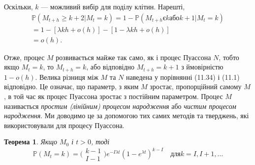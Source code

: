\documentclass[12pt,fleqn]{article}
\newtheorem{theorem}{Теорема}[section]
\numberwithin{figure}{section}
\numberwithin{equation}{section}
\begin{document}
Оскільки, $k$ --- можливий вибір для поділу клітин. Нарешті,
\begin{equation}
\begin{gathered}
\mathbb{P}(M_{t+h}\geq k + 2 \big| M_t = k) = 1 - \mathbb{P}(M_{t+h} \text{є} k \text{або} k+1 \big| M_t=k)
\\ = 1- [\lambda kh + o(h)] - [1-\lambda kh + o(h)]
\\= o(h).
\end{gathered}
\end{equation}

Отже, процес $M$ розвивається майже так само, як і процес Пуассона $N$, тобто якщо $M_t = k$, то $M_{t+h} = k$, або відповідно $M_{t+h} = k+1$ з ймовірністю $1-o(h)$. Велика різниця між $M$ та $N$ наведена у порівнянні (11.34) і (11.1) відповідно. Це означає, що параметр, з яким $M$ зростає, пропорційний самому $M$, в той час як процес Пуассона зростає з постійним параметром. Процес $M$ називається \emph{простим (лінійним) процесом народження} або \emph{чистим процесом народження}. Ми доводимо це за допомогою тих самих методів та тверджень, які використовували для процесу Пуассона.

\begin{theorem}
  Якщо $M_0$ і $t>0$, тоді
  \begin{equation}\label{11.37}
    \mathbb{P}(M_t=k) = \bigg(\begin{matrix}
                          k-1 \\
                          I-1
                        \end{matrix}\bigg) e^{-I\lambda t}(1-e^{\lambda t})^{k-I}\quad \text{для} k=I, I+1, \dots
  \end{equation}
\end{theorem}
\end{document}
